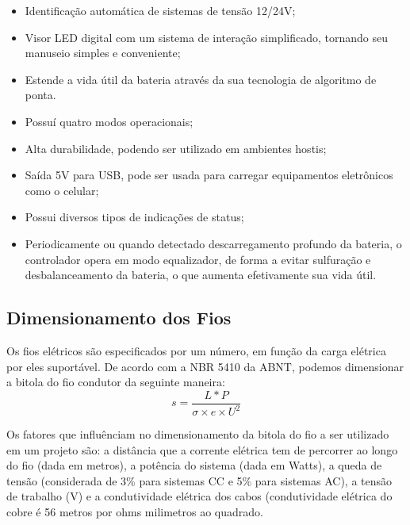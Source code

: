     \begin{itemize}
\item{Identificação automática de sistemas de tensão 12/24V;}
\item{Visor LED digital com um sistema de interação simplificado, tornando seu manuseio simples e conveniente;}
\item{Estende a vida útil da bateria através da sua tecnologia de algoritmo de ponta.}
\item{Possuí quatro modos operacionais;}
\item{Alta durabilidade, podendo ser utilizado em ambientes hostis;}
\item{Saída 5V para USB, pode ser usada para carregar equipamentos eletrônicos como o celular;}
\item{Possui diversos tipos de indicações de status;}
\item{Periodicamente ou quando detectado descarregamento profundo da bateria, o controlador opera em modo equalizador, de forma a evitar sulfuração e desbalanceamento da bateria, o que aumenta efetivamente sua vida útil.}

\end{itemize}


\subsection{Dimensionamento dos Fios}
\par Os fios elétricos são especificados por um número, em função da carga elétrica por eles suportável. De acordo com a NBR 5410 da ABNT, podemos dimensionar a bitola do fio condutor da seguinte maneira:
\begin{equation}
s= \frac{L*P}{\sigma \times e\times {U}^{2}}
\end{equation}

\par Os fatores que influênciam no dimensionamento da bitola do fio a ser utilizado em um projeto são: a distância que a corrente elétrica tem de percorrer ao longo do fio (dada em metros), a potência do sistema (dada em Watts), a queda de tensão (considerada de 3\% para sistemas CC e 5\% para sistemas AC), a tensão de trabalho (V) e a condutividade elétrica dos cabos (condutividade elétrica do cobre é 56 metros por ohms milimetros ao quadrado.

